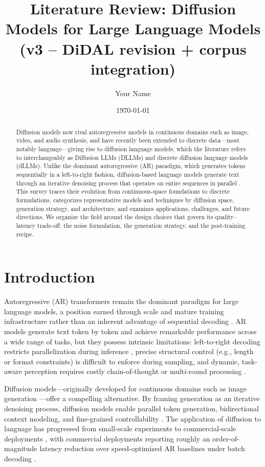 \documentclass[11pt]{article}
\title{Literature Review: Diffusion Models for Large Language Models (v3 -- DiDAL revision + corpus integration)}
\author{Your Name}
\date{\today}
\begin{document}
\maketitle

\begin{abstract}
Diffusion models now rival autoregressive models in continuous domains such as image, video, and audio synthesis, and have recently been extended to discrete data---most notably language---giving rise to diffusion language models, which the literature refers to interchangeably as Diffusion LLMs (DLLMs) and discrete diffusion language models (dLLMs). Unlike the dominant autoregressive (AR) paradigm, which generates tokens sequentially in a left-to-right fashion, diffusion-based language models generate text through an iterative denoising process that operates on entire sequences in parallel \cite{yu2025discrete, tseng2025diffusion}. This survey traces their evolution from continuous-space foundations to discrete formulations, categorizes representative models and techniques by diffusion space, generation strategy, and architecture, and examines applications, challenges, and future directions. We organize the field around the design choices that govern its quality--latency trade-off: the noise formulation, the generation strategy, and the post-training recipe.
\end{abstract}

\section{Introduction}

Autoregressive (AR) transformers remain the dominant paradigm for large language models, a position earned through scale and mature training infrastructure rather than an inherent advantage of sequential decoding \cite{yu2025discrete}. AR models generate text token by token and achieve remarkable performance across a wide range of tasks, but they possess intrinsic limitations: left-to-right decoding restricts parallelization during inference \cite{yu2025discrete}, precise structural control (e.g., length or format constraints) is difficult to enforce during sampling, and dynamic, task-aware perception requires costly chain-of-thought or multi-round processing \cite{yu2025discrete}.

Diffusion models---originally developed for continuous domains such as image generation \cite{ho2020denoising}---offer a compelling alternative. By framing generation as an iterative denoising process, diffusion models enable parallel token generation, bidirectional context modeling, and fine-grained controllability \cite{li2025surveydlm}. The application of diffusion to language has progressed from small-scale experiments to commercial-scale deployments \cite{khanna2025mercury}, with commercial deployments reporting roughly an order-of-magnitude latency reduction over speed-optimized AR baselines under batch decoding \cite{yu2025discrete, wang2025d2f}.
\end{document}
